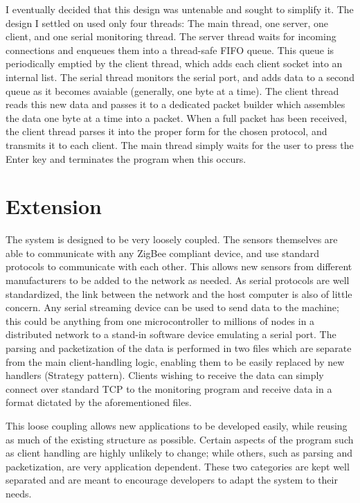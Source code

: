\documentclass[a4paper,10pt]{article}
\begin{document}
I eventually decided that this design was untenable and sought to simplify
it. The design I settled on used only four threads: The main thread, one server,
one client, and one serial monitoring thread. The server thread waits for
incoming connections and enqueues them into a thread-safe FIFO queue. This queue
is periodically emptied by the client thread, which adds each client socket into
an internal list. The serial thread monitors the serial port, and adds data to a
second queue as it becomes avaiable (generally, one byte at a time). The client
thread reads this new data and passes it to a dedicated packet builder which
assembles the data one byte at a time into a packet. When a full packet has been
received, the client thread parses it into the proper form for the chosen
protocol, and transmits it to each client. The main thread simply waits for the
user to press the Enter key and terminates the program when this occurs.

\section{Extension}
The system is designed to be very loosely coupled. The sensors themselves are
able to communicate with any ZigBee compliant device, and use standard protocols
to communicate with each other. This allows new sensors from different
manufacturers to be added to the network as needed. As serial protocols are well
standardized, the link between the network and the host computer is also of
little concern. Any serial streaming device can be used to send data to the
machine; this could be anything from one microcontroller to millions of nodes in
a distributed network to a stand-in software device emulating a serial port. The
parsing and packetization of the data is performed in two files which are
separate from the main client-handling logic, enabling them to be easily
replaced by new handlers (Strategy pattern). Clients wishing to receive the data
can simply connect over standard TCP to the monitoring program and receive data
in a format dictated by the aforementioned files.

This loose coupling allows new applications to be developed easily, while
reusing as much of the existing structure as possible. Certain aspects of the
program such as client handling are highly unlikely to change; while others,
such as parsing and packetization, are very application dependent. These two
categories are kept well separated and are meant to encourage developers to
adapt the system to their needs.
\end{document}
